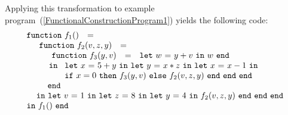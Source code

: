 Applying this transformation to example
program~(\ref{FunctionalConstructionProgram1}) yields the following
code:
\begin{equation}
\label{FunctionalConstructionProgram3}
\begin{array}{l}
  \begin{array}{lcl}\mathtt{function}\ f_1() & = & \end{array}\\
  \quad
   \begin{array}[t]{l} 
     \begin{array}{lcl}\mathtt{function}\ f_2(v,z,y) & = & \end{array}\\
     \quad \begin{array}{l}  
             \begin{array}{lcl}\mathtt{function}\ f_3(y,v) & = & \letin w {y+v} w\end{array}\\
             \, \mathtt{in}\
              \begin{array}[t]{l}
                \letinD x {5+y} {
                  \letinD y {x*z} {
                   \letinD x {x-1} {}}}\\ 
                  \ite {x=0} {\call {f_3} {y,v}}
                     {\call {f_2} {v,z,y}}\ \mathtt{end}\ \mathtt{end}\ \mathtt{end}
              \end{array}\\
             \mathtt{end}
           \end{array}\\
     \, \mathtt{in}\ \letin v 1 {
              \letin z 8 {
                 \letin y 4 {\call {f_2} {v,z,y}}
              }
            }
   \end{array}\\
\begin{array}{lcl}
  \mathtt{in}\ f_1()\ \mathtt{end}
\end{array} 
\end{array}
\end{equation}

